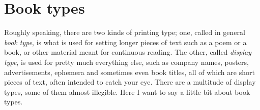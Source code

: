 \documentclass[10pt,letterpaper,extrafontsizes]{memoir}
\newcommand{\PWnote}[2]{}
\begin{document}
\section{Book types}

\PWnote{2009/04/25}{Added longish section on book types}
\PWnote{2009/04/25}{Used endnotes in book types section}

    Roughly speaking, there are two kinds of printing type;
one, called 
in general \emph{book type}, 
is what is used for setting longer pieces 
of text such as a poem or a book, or other material meant for continuous
reading. The other, called \emph{display type}, is used 
for pretty much everything else, such as company names, posters,
advertisements, ephemera and sometimes even book titles, all of which are 
short pieces of text, often intended to catch your eye. There are a multitude
of display types, some of them almost illegible. Here I want to say a little
bit about book types.
\end{document}
